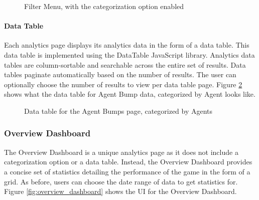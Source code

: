\begin{figure}[hbt]
	\caption{\label{fig:filter_menu} Filter Menu, with the categorization option enabled}
\end{figure}

\paragraph{Data Table}

Each analytics page displays its analytics data in the form of a data table. This data table is implemented using the DataTable JavaScript library. Analytics data tables are column-sortable and searchable across the entire set of results. Data tables paginate automatically based on the number of results. The user can optionally choose the number of results to view per data table page. Figure \ref{fig:data_table} shows what the data table for Agent Bump data, categorized by Agent looks like. 

\begin{figure}[hbt]
	\caption{\label{fig:data_table} Data table for the Agent Bumps page, categorized by Agents}
\end{figure}

\subsubsection{Overview Dashboard}

The Overview Dashboard is a unique analytics page as it does not include a categorization option or a data table. Instead, the Overview Dashboard provides a concise set of statistics detailing the performance of the game in the form of a grid. As before, users can choose the date range of data to get statistics for. Figure \ref{fig:overview_dashboard} shows the UI for the Overview Dashboard.

